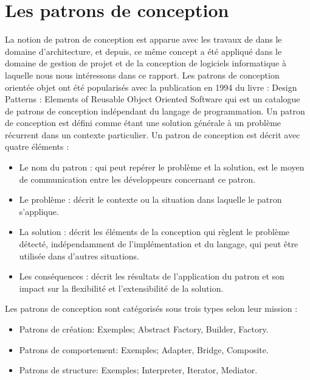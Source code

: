 \section{Les patrons de conception}
La notion de patron de conception est apparue avec les travaux de \cite{alexander1977pattern} dans le domaine d’architecture, et depuis, ce même concept a été appliqué dans le domaine de gestion de projet et de la conception de logiciels informatique à laquelle nous nous intéressons dans ce rapport. \newline
Les patrons de conception orientée objet ont été popularisés avec la publication en 1994 du livre : Design Patterns : Elements of Reusable Object Oriented Software \cite{vlissides1995design} qui est un catalogue de patrons de conception indépendant du langage de programmation. \newline
Un patron de conception est défini comme étant une solution générale à un problème récurrent dans un contexte particulier. Un patron de conception est décrit avec quatre éléments \cite{vlissides1995design}:
\newline
\begin{itemize}
   

  \item Le nom du patron : qui peut repérer le problème et la solution, est le moyen de communication entre les développeurs concernant ce patron.
  \item Le problème : décrit le contexte ou la situation dans laquelle le patron s’applique.
  \item La solution : décrit les éléments de la conception qui règlent le problème détecté, indépendamment de l’implémentation et du langage, qui peut être utilisée dans d’autres situations.
  \item Les conséquences : décrit les résultats de l’application du patron et son impact sur la flexibilité et l’extensibilité de la solution.
\end{itemize}
\newline
Les patrons de conception sont catégorisés sous trois types selon leur mission :
\begin{itemize}
    \item Patrons de création: Exemples; Abstract Factory, Builder, Factory.
    \item Patrons de comportement: Exemples; Adapter, Bridge, Composite.
    \item Patrons de structure: Exemples; Interpreter, Iterator, Mediator.
\end{itemize}

